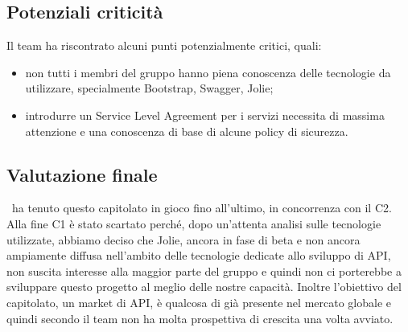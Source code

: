 \documentclass[../StudioDiFattibilita.tex]{subfiles}
\begin{document}
		\subsection{Potenziali criticità}
		Il team ha riscontrato alcuni punti potenzialmente critici, quali:
			\begin{itemize}
				\item non tutti i membri del gruppo hanno piena conoscenza delle tecnologie da utilizzare, specialmente Bootstrap, Swagger, Jolie;
        		\item introdurre un Service Level Agreement per i servizi  necessita di massima attenzione e una conoscenza di base di alcune policy di sicurezza.
			\end{itemize}

	\subsection{Valutazione finale}
	\kpanic\ ha tenuto questo capitolato in gioco fino all'ultimo, in concorrenza con il C2. Alla fine C1 è stato scartato perché, dopo un'attenta analisi sulle tecnologie utilizzate, abbiamo deciso che Jolie, ancora in fase di beta e non ancora ampiamente diffusa nell'ambito delle tecnologie dedicate allo sviluppo di API, non suscita interesse alla maggior parte del gruppo e quindi non ci porterebbe a sviluppare questo progetto al meglio delle nostre capacità. Inoltre l'obiettivo del capitolato, un market di API, è qualcosa di già presente nel mercato globale e quindi secondo il team non ha molta prospettiva di crescita una volta avviato.
\end{document}
